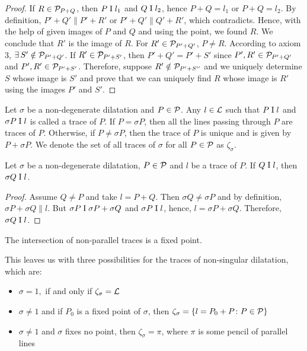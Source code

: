 \begin{proof}
    \vspace{1ex}

    If $R \in \mathcal{P}_{P+Q}$, then $P \mathrel\text{I} l_1$ and $Q \mathrel\text{I} l_2$, hence $P+Q = l_1$ or $P+Q = l_2$. By definition, $P'+Q' \parallel P' + R'$ or $P'+Q' \parallel Q' + R'$, which contradicts. Hence, with the help of given images of $P$ and $Q$ and using the point, we found $R$. We conclude that $R'$ is the image of $R$. For $R' \in \mathcal{P}_{P'+Q'}$, $P \neq R$. According to axiom 3, $\exists\, S' \notin \mathcal{P}_{P'+Q'}$. If $R' \in \mathcal{P}_{P'+S'}$,  then $P'+Q'=P'+S'$ since $P',R' \in \mathcal{P}_{P'+Q'}$ and $P',R' \in \mathcal{P}_{P'+S'}$. Therefore, suppose $R' \notin \mathcal{P}_{P'+S''}$ and we uniquely determine $S$ whose image is $S'$ and prove that we can uniquely find $R$ whose image is $R'$ using the images $P'$ and $S'$.
\end{proof}

\begin{definition}
    Let $\sigma$ be a non-degenerate dilatation and $P \in \mathcal{P}$. Any $l \in \mathcal{L}$ such that $P \mathrel\text{I} l$ and $\sigma P \mathrel\text{I} l$ is called a trace of $P$. If $P = \sigma P$, then all the lines passing through $P$ are traces of $P$. Otherwise, if $P \neq \sigma P$, then the trace of $P$ is unique and is given by $P + \sigma P$. We denote the set of all traces of $\sigma$ for all $P \in \mathcal{P}$ as $\zeta_\sigma$.
\end{definition}

\begin{theorem} \label{thm:dil_on_same_line}
    Let $\sigma$ be a non-degenerate dilatation, $P \in \mathcal{P}$ and $l$ be a trace of $P$. If $Q \mathrel\text{I} l$, then $\sigma Q \mathrel\text{I} l$. 
\end{theorem}

\begin{proof}
    Assume $Q \neq P$ and take $l=P+Q$. Then $\sigma Q \neq \sigma P$ and by definition, $\sigma P + \sigma Q \parallel l$. But $\sigma P \mathrel\text{I} \sigma P + \sigma Q$ and $ \sigma P \mathrel\text{I} l$, hence, $l=\sigma P + \sigma Q.$ Therefore, $\sigma Q \mathrel\text{I} l$.
\end{proof}

\begin{coro}
    The intersection of non-parallel traces is a fixed point.
\end{coro}

\noindent
This leaves us with three possibilities for the traces of non-singular dilatation, which are:
\begin{itemize}
    \item $\sigma=1,$ if and only if $\zeta_\sigma = \mathcal{L}$
    \item $\sigma \neq 1$ and if $P_0$ is a fixed point of $\sigma$, then $\zeta_\sigma = \{l=P_0+P\colon P \in \mathcal{P}\}$
    \item $\sigma \neq 1$ and $\sigma$ fixes no point, then $\zeta_\sigma = \pi$, where $\pi$ is some pencil of parallel lines
\end{itemize}

